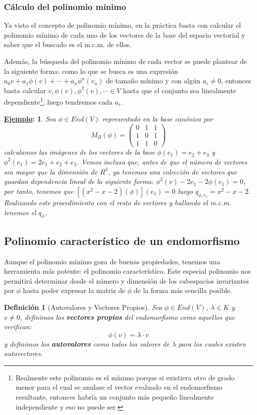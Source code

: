 \documentclass[10pt,a4paper,openright]{book}
\theoremstyle{break}
\newtheorem*{defi}{Definición}
\newtheorem*{ej}{\underline{Ejemplo}:}
\begin{document}
\subsubsection{Cálculo del polinomio mínimo}
Ya visto el concepto de polinomio mínimo, en la práctica basta con calcular el polinomio mínimo de cada uno de los vectores de la base del espacio vectorial y saber que el buscado es el m.c.m. de ellos.

Además, la búsqueda del polinomio mínimo de cada vector se puede plantear de la siguiente forma: como lo que se busca es una expresión $a_0v+a_1\phi(v)+\cdots+a_n\phi^n(v_n)$ de tamaño mínimo y con algún $a_i\neq 0$, entonces basta calcular $v,\phi(v), \phi^2(v),\cdots \in V$ hasta que el conjunto sea linealmente dependiente\footnote{Realmente este polinomio es el mínimo porque si existiera otro de grado menor para el cual se anulase el vector evaluado en el endomorfismo resultante, entonces habría un conjunto más pequeño linealmente independiente y eso no puede ser.}, luego tendremos cada $a_i$.

\begin{ej}
Sea $\phi\in End(V)$ representado en la base canónica por
$$M_B(\phi)=\begin{pmatrix} 0&1&1\\1&0&1\\1&1&0\end{pmatrix}$$
calculamos las imágenes de los vectores de la base $\phi(e_1) = e_2+e_3$ y $\phi^2(e_1)=2e_1+e_2+e_3$. Vemos incluso que, antes de que el número de vectores sea mayor que la dimensión de $R^3$, ya tenemos una colección de vectores que guardan dependencia lineal de la siguiente forma: $\phi^2(v)-2e_1-2\phi(e_1)=0$, por tanto, tenemos que $[(x^2-x-2)(\phi)](e_1)=0$ luego $q_{\phi,e_1}=x^2-x-2$.
Realizando este procedimiento con el resto de vectores y hallando el m.c.m. tenemos el $q_\phi$.
\end{ej}

\subsection{Polinomio característico de un endomorfismo}
Aunque el polinomio mínimo goza de buenas propiedades, tenemos una herramienta más potente: el  polinomio característico. Este especial polinomio nos permitirá determinar desde el número y dimensión de los subespacios invariantes por $\phi$ hasta poder expresar la matriz de $\phi$ de la forma más sencilla posible.

\begin{defi}[Autovalores y Vectores Propios]
Sea $\phi\in End(V)$, $\lambda\in K$ y $v\neq 0$, definimos los \textbf{vectores propios} del endomorfismo como aquellos que verifican:
$$\phi(v) = \lambda \cdot v$$
y definimos los \textbf{autovalores} como todos los valores de $\lambda$ para los cuales existen autovectores.
\end{defi}
\end{document}
